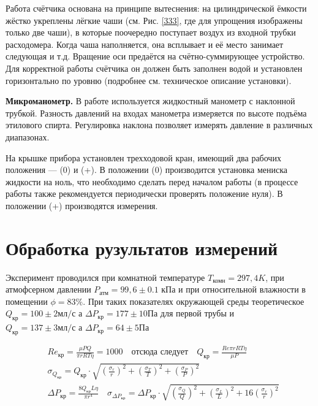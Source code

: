 \documentclass[a4paper, 12pt]{article}
\begin{document}
Работа счётчика основана на принципе вытеснения: на цилиндрической ёмкости жёстко
укреплены лёгкие чаши (см. Рис. \ref{333}, где для
упрощения изображены только две чаши), в которые поочередно поступает воздух из входной
трубки расходомера. Когда чаша наполняется,
она всплывает и её место занимает следующая
и т.д. Вращение оси предаётся на счётно-суммирующее устройство.
Для корректной работы счётчика он должен
быть заполнен водой и установлен горизонтально по уровню (подробнее см. техническое
описание установки).

\textbf{Микроманометр.} В работе используется жидкостный манометр с наклонной трубкой. Разность давлений на входах манометра измеряется по высоте
подъёма этилового спирта. Регулировка
наклона позволяет измерять давление в различных диапазонах.

На крышке прибора установлен трехходовой кран, имеющий два рабочих
положения — (0) и (+). В положении (0) производится установка мениска жидкости на ноль, что необходимо сделать перед началом работы (в процессе работы также рекомендуется периодически проверять положение нуля). В положении (+) производятся измерения.


\section{Обработка рузультатов измерений}

Эксперимент проводился при комнатной температуре $T_\text{комн}=297,4 K$, при атмофсерном давлении $P_\text{атм}=99,6 \pm 0.1$ кПа и при относительной влажности в помещении $\phi=83\%$.
При таких показателях окружающей среды теоретическое $Q_\text{кр} = 100 \pm 2 \text{мл/с}$ а $\Delta P_\text{кр} = 177 \pm 10\text{Па}$ для первой трубы и \\
$Q_\text{кр} = 137 \pm 3 \text{мл/с}$ а $\Delta P_\text{кр} = 64 \pm 5\text{Па}$

\begin{align}
    &Re_{\text{кр}} = \frac{\mu P Q}{\pi r R T \eta} = 1000 \quad \text{отсюда следует} \quad Q_{\text{кр}} = \frac{Re \pi r R T \eta}{\mu P}  \\
    &\sigma_{Q_{\text{кр}}} = Q_{\text{кр}} \cdot \sqrt{(\frac{\sigma_r}{r})^2 + (\frac{\sigma_T}{T})^2 + (\frac{\sigma_P}{P})^2} \\
    &\Delta P_{\text{кр}} =\frac{ 8Q_{\text{кр}} L \eta}{\pi r^4}  \quad \sigma_{\Delta P_{\text{кр}}} = \Delta P_{\text{кр}} \cdot \sqrt{(\frac{\sigma_Q}{Q})^2 + (\frac{\sigma_L}{L})^2 +  16 (\frac{\sigma_r}{r})^2}
\end{align}
\end{document}

